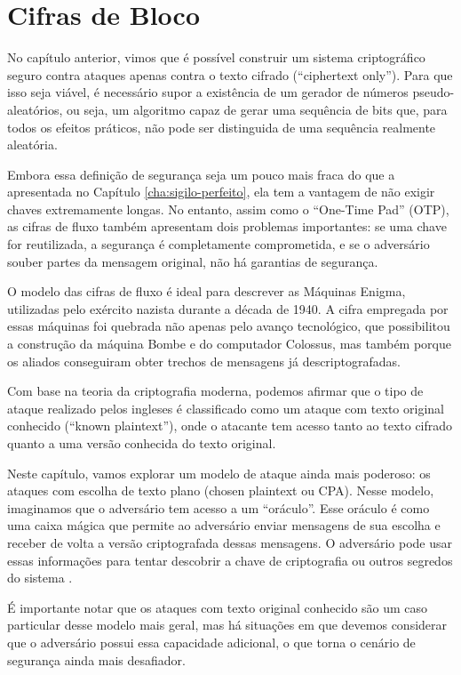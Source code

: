 \chapter{Cifras de Bloco}
\label{cha:cifras-de-bloco}

No capítulo anterior, vimos que é possível construir um sistema criptográfico seguro contra ataques apenas contra o texto cifrado (``ciphertext only'').
Para que isso seja viável, é necessário supor a existência de um gerador de números pseudo-aleatórios, ou seja, um algoritmo capaz de gerar uma sequência de bits que, para todos os efeitos práticos, não pode ser distinguida de uma sequência realmente aleatória.

Embora essa definição de segurança seja um pouco mais fraca do que a apresentada no Capítulo \ref{cha:sigilo-perfeito}, ela tem a vantagem de não exigir chaves extremamente longas.
No entanto, assim como o ``One-Time Pad'' (OTP), as cifras de fluxo também apresentam dois problemas importantes:
se uma chave for reutilizada, a segurança é completamente comprometida, e se o adversário souber partes da mensagem original, não há garantias de segurança.

O modelo das cifras de fluxo é ideal para descrever as Máquinas Enigma, utilizadas pelo exército nazista durante a década de 1940.
A cifra empregada por essas máquinas foi quebrada não apenas pelo avanço tecnológico, que possibilitou a construção da máquina Bombe e do computador Colossus, mas também porque os aliados conseguiram obter trechos de mensagens já descriptografadas.

Com base na teoria da criptografia moderna, podemos afirmar que o tipo de ataque realizado pelos ingleses é classificado como um ataque com texto original conhecido (``known plaintext''), onde o atacante tem acesso tanto ao texto cifrado quanto a uma versão conhecida do texto original.

Neste capítulo, vamos explorar um modelo de ataque ainda mais poderoso:
os ataques com escolha de texto plano (chosen plaintext ou CPA).
Nesse modelo, imaginamos que o adversário tem acesso a um ``oráculo''.
Esse oráculo é como uma caixa mágica que permite ao adversário enviar mensagens de sua escolha e receber de volta a versão criptografada dessas mensagens.
O adversário pode usar essas informações para tentar descobrir a chave de criptografia ou outros segredos do sistema \cite{Bellare97}.

É importante notar que os ataques com texto original conhecido são um caso particular desse modelo mais geral, mas há situações em que devemos considerar que o adversário possui essa capacidade adicional, o que torna o cenário de segurança ainda mais desafiador.


